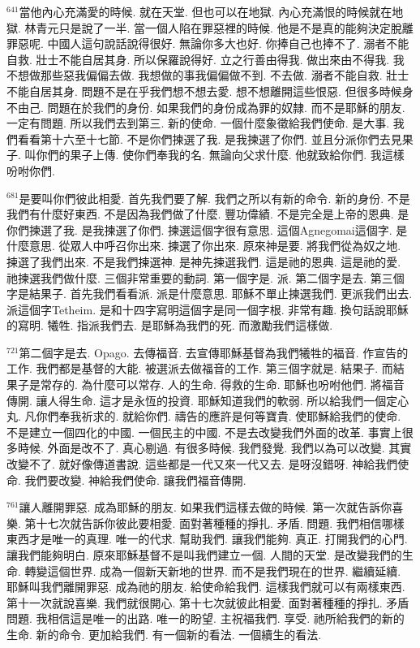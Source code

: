 \documentclass{book}
\begin{document}
$^{641}$當他內心充滿愛的時候.
就在天堂.
但也可以在地獄.
內心充滿恨的時候就在地獄.
林青元只是說了一半.
當一個人陷在罪惡裡的時候.
他是不是真的能夠決定脫離罪惡呢.
中國人這句說話說得很好.
無論你多大也好.
你捧自己也捧不了.
溺者不能自救.
壯士不能自居其身.
所以保羅說得好.
立之行善由得我.
做出來由不得我.
我不想做那些惡我偏偏去做.
我想做的事我偏偏做不到.
不去做.
溺者不能自救.
壯士不能自居其身.
問題不是在乎我們想不想去愛.
想不想離開這些恨惡.
但很多時候身不由己.
問題在於我們的身份.
如果我們的身份成為罪的奴隸.
而不是耶穌的朋友.
一定有問題.
所以我們去到第三.
新的使命.
一個什麼象徵給我們使命.
是大事.
我們看看第十六至十七節.
不是你們揀選了我.
是我揀選了你們.
並且分派你們去見果子.
叫你們的果子上傳.
使你們奉我的名.
無論向父求什麼.
他就致給你們.
我這樣吩咐你們.

$^{681}$是要叫你們彼此相愛.
首先我們要了解.
我們之所以有新的命令.
新的身份.
不是我們有什麼好東西.
不是因為我們做了什麼.
豐功偉績.
不是完全是上帝的恩典.
是你們揀選了我.
是我揀選了你們.
揀選這個字很有意思.
這個Agnegomai這個字.
是什麼意思.
從眾人中呼召你出來.
揀選了你出來.
原來神是要.
將我們從為奴之地.
揀選了我們出來.
不是我們揀選神.
是神先揀選我們.
這是祂的恩典.
這是祂的愛.
祂揀選我們做什麼.
三個非常重要的動詞.
第一個字是.
派.
第二個字是去.
第三個字是結果子.
首先我們看看派.
派是什麼意思.
耶穌不單止揀選我們.
更派我們出去.
派這個字Tetheim.
是和十四字寫明這個字是同一個字根.
非常有趣.
換句話說耶穌的寫明.
犧牲.
指派我們去.
是耶穌為我們的死.
而激勵我們這樣做.

$^{721}$第二個字是去.
Opago.
去傳福音.
去宣傳耶穌基督為我們犧牲的福音.
作宣告的工作.
我們都是基督的大能.
被選派去做福音的工作.
第三個字就是.
結果子.
而結果子是常存的.
為什麼可以常存.
人的生命.
得救的生命.
耶穌也吩咐他們.
將福音傳開.
讓人得生命.
這才是永恆的投資.
耶穌知道我們的軟弱.
所以給我們一個定心丸.
凡你們奉我祈求的.
就給你們.
禱告的應許是何等寶貴.
使耶穌給我們的使命.
不是建立一個四化的中國.
一個民主的中國.
不是去改變我們外面的改革.
事實上很多時候.
外面是改不了.
真心剔過.
有很多時候.
我們發覺.
我們以為可以改變.
其實改變不了.
就好像傳道書說.
這些都是一代又來一代又去.
是呀沒錯呀.
神給我們使命.
我們要改變.
神給我們使命.
讓我們福音傳開.

$^{761}$讓人離開罪惡.
成為耶穌的朋友.
如果我們這樣去做的時候.
第一次就告訴你喜樂.
第十七次就告訴你彼此要相愛.
面對著種種的掙扎.
矛盾.
問題.
我們相信哪樣東西才是唯一的真理.
唯一的代求.
幫助我們.
讓我們能夠.
真正.
打開我們的心門.
讓我們能夠明白.
原來耶穌基督不是叫我們建立一個.
人間的天堂.
是改變我們的生命.
轉變這個世界.
成為一個新天新地的世界.
而不是我們現在的世界.
繼續延續.
耶穌叫我們離開罪惡.
成為祂的朋友.
給使命給我們.
這樣我們就可以有兩樣東西.
第十一次就說喜樂.
我們就很開心.
第十七次就彼此相愛.
面對著種種的掙扎.
矛盾問題.
我相信這是唯一的出路.
唯一的盼望.
主祝福我們.
享受.
祂所給我們的新的生命.
新的命令.
更加給我們.
有一個新的看法.
一個續生的看法.
\end{document}
